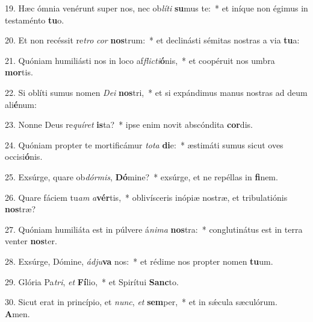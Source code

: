 19. Hæc ómnia venérunt super nos, nec ob\textit{lí}\textit{ti} \textbf{su}mus te:~*  et iníque non égimus in testaménto \textbf{tu}o.\

20. Et non recéssit re\textit{tro} \textit{cor} \textbf{nos}trum:~*  et declinásti sémitas nostras a via \textbf{tu}a:\

21. Quóniam humiliásti nos in loco af\textit{flic}\textit{ti}\textbf{ó}nis,~*  et coopéruit nos umbra \textbf{mor}tis.\

22. Si oblíti sumus nomen \textit{De}\textit{i} \textbf{nos}tri,~*  et si expándimus manus nostras ad deum ali\textbf{é}num:\

23. Nonne Deus re\textit{quí}\textit{ret} \textbf{is}ta?~*  ipse enim novit abscóndita \textbf{cor}dis.\

24. Quóniam propter te mortificámur \textit{to}\textit{ta} \textbf{di}e:~*  æstimáti sumus sicut oves occisi\textbf{ó}nis.\

25. Exsúrge, quare ob\textit{dór}\textit{mis}, \textbf{Dó}mine?~*  exsúrge, et ne repéllas in \textbf{fi}nem.\

26. Quare fáciem tu\textit{am} \textit{a}\textbf{vér}tis,~*  oblivísceris inópiæ nostræ, et tribulatiónis \textbf{nos}træ?\

27. Quóniam humiliáta est in púlvere á\textit{ni}\textit{ma} \textbf{nos}tra:~*  conglutinátus est in terra venter \textbf{nos}ter.\

28. Exsúrge, Dómine, \textit{ád}\textit{ju}\textbf{va} nos:~*  et rédime nos propter nomen \textbf{tu}um.\

29. Glória Pa\textit{tri}, \textit{et} \textbf{Fí}lio,~*  et Spirítui \textbf{Sanc}to.\

30. Sicut erat in princípio, et \textit{nunc}, \textit{et} \textbf{sem}per,~*  et in sǽcula sæculórum. \textbf{A}men.\

